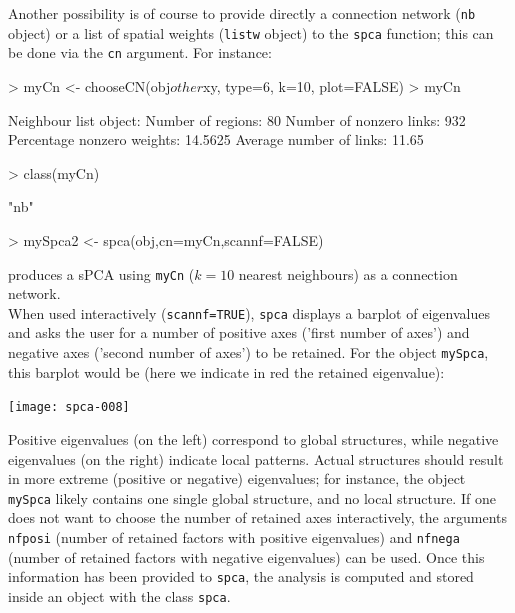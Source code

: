 \documentclass{article}
\begin{document}
Another possibility is of course to provide directly a connection
network (\texttt{nb} object) or a list of spatial weights
(\texttt{listw} object) to the \texttt{spca} function; this can be done via the \texttt{cn} argument.
For instance:
\begin{Schunk}
\begin{Sinput}
> myCn <- chooseCN(obj$other$xy, type=6, k=10, plot=FALSE)
> myCn
\end{Sinput}
\begin{Soutput}
Neighbour list object:
Number of regions: 80 
Number of nonzero links: 932 
Percentage nonzero weights: 14.5625 
Average number of links: 11.65 
\end{Soutput}
\begin{Sinput}
> class(myCn)
\end{Sinput}
\begin{Soutput}
[1] "nb"
\end{Soutput}
\begin{Sinput}
> mySpca2 <- spca(obj,cn=myCn,scannf=FALSE)
\end{Sinput}
\end{Schunk}
\noindent produces a sPCA using \texttt{myCn} ($k=10$ nearest
neighbours) as a connection network.
\\


When used interactively (\texttt{scannf=TRUE}), \texttt{spca} displays a barplot of eigenvalues and
asks the user for a number of positive axes ('first number of axes') and negative
axes ('second number of axes') to be retained.
For the object \texttt{mySpca}, this barplot would be (here we
indicate in red the retained eigenvalue):
\begin{Schunk}
\end{Schunk}
\texttt{[image: spca-008]}

\noindent Positive eigenvalues (on the left) correspond to global
structures, while negative eigenvalues (on the right) indicate local patterns.
Actual structures should result in more extreme (positive or
negative) eigenvalues; for instance, the object \texttt{mySpca} likely
contains one single global structure, and no local structure.
If one does not want to choose the number of retained axes
interactively, the arguments \texttt{nfposi} (number of retained
factors with positive eigenvalues) and \texttt{nfnega} (number of
retained factors with negative eigenvalues) can be used.
Once this information has been provided to \texttt{spca}, the
analysis is computed and stored inside an object with the class \texttt{spca}.
\end{document}
